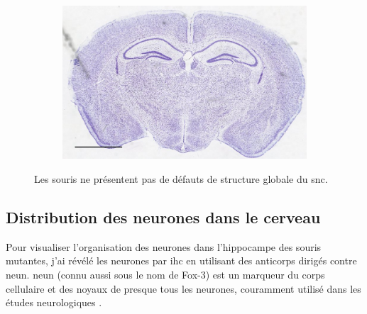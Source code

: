 \begin{figure}[h]
\begin{center}
\begin{subfigure}[h]{0.49\textwidth}
				\end{subfigure}
				\begin{subfigure}[h]{0.49\textwidth}%
					\caption{}
					\label{fig:MaleMutNissl}
					\includegraphics[width=\textwidth]{./Images/Nissl/MaleMut.jpg}
				\end{subfigure}
			\end{center}
			\caption{Les souris \mcrd ne présentent pas de défauts de structure globale du \acrshort{snc}.}
			\label{fig:NisslResultat}
		\end{figure}
		\FloatBarrier

	\subsection{Distribution des neurones dans le cerveau}
	\label{ssec:neun}
		Pour visualiser l'organisation des neurones dans l'hippocampe des souris mutantes, j'ai révélé les neurones par \acrshort{ihc} en utilisant des anticorps dirigés contre \acrshort{neun}. \Acrshort{neun} (connu aussi sous le nom de Fox-3) est un marqueur du  corps cellulaire et des noyaux de presque tous les neurones, couramment utilisé dans les études neurologiques \cite{Guselnikova2015, Kim2009}. 
		
